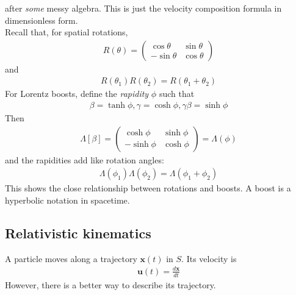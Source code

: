 \documentclass[a4paper]{article}
\begin{document}
after \emph{some} messy algebra. This is just the velocity composition formula in dimensionless form.\\
Recall that, for spatial rotations,
\begin{equation*}
\begin{aligned}
R\left(\theta\right) = \left(\begin{matrix}
\cos\theta & \sin\theta\\
-\sin\theta & \cos\theta
\end{matrix}\right)
\end{aligned}
\end{equation*}
and
\begin{equation*}
\begin{aligned}
R\left(\theta_1\right) R\left(\theta_2\right) = R\left(\theta_1 + \theta_2\right)
\end{aligned}
\end{equation*}
For Lorentz boosts, define the \emph{rapidity} $\phi$ such that
\begin{equation*}
\begin{aligned}
\beta = \tanh\phi, \gamma = \cosh \phi, \gamma\beta = \sinh \phi
\end{aligned}
\end{equation*}
Then
\begin{equation*}
\begin{aligned}
\Lambda\left[\beta\right] = \left(\begin{matrix}
\cosh\phi & \sinh\phi\\
-\sinh\phi & \cosh\phi
\end{matrix}\right)=\Lambda\left(\phi\right)
\end{aligned}
\end{equation*}
and the rapidities add like rotation angles:
\begin{equation*}
\begin{aligned}
\Lambda\left(\phi_1\right) \Lambda \left(\phi_2\right) = \Lambda \left(\phi_1+\phi_2\right)
\end{aligned}
\end{equation*}
This shows the close relationship between rotations and boosts. A boost is a hyperbolic notation in spacetime.

\subsection{Relativistic kinematics}
A particle moves along a trajectory $\mathbf{x}\left(t\right)$ in $S$. Its velocity is
\begin{equation*}
\begin{aligned}
\mathbf{u}\left(t\right) = \frac{d\mathbf{x}}{dt}
\end{aligned}
\end{equation*}
However, there is a better way to describe its trajectory.\\
\end{document}
